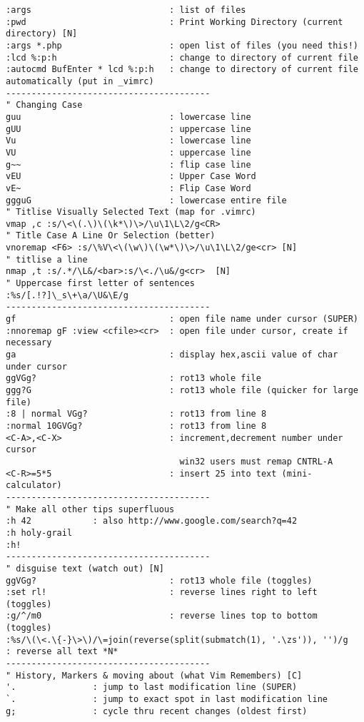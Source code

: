 \documentclass[10pt,landscape]{article}
\begin{document}
\begin{multicols}{2}
\begin{verbatim}
:args                           : list of files
:pwd                            : Print Working Directory (current directory) [N]
:args *.php                     : open list of files (you need this!)
:lcd %:p:h                      : change to directory of current file
:autocmd BufEnter * lcd %:p:h   : change to directory of current file automatically (put in _vimrc)
----------------------------------------
" Changing Case
guu                             : lowercase line
gUU                             : uppercase line
Vu                              : lowercase line
VU                              : uppercase line
g~~                             : flip case line
vEU                             : Upper Case Word
vE~                             : Flip Case Word
ggguG                           : lowercase entire file
" Titlise Visually Selected Text (map for .vimrc)
vmap ,c :s/\<\(.\)\(\k*\)\>/\u\1\L\2/g<CR>
" Title Case A Line Or Selection (better)
vnoremap <F6> :s/\%V\<\(\w\)\(\w*\)\>/\u\1\L\2/ge<cr> [N]
" titlise a line
nmap ,t :s/.*/\L&/<bar>:s/\<./\u&/g<cr>  [N]
" Uppercase first letter of sentences
:%s/[.!?]\_s\+\a/\U&\E/g
----------------------------------------
gf                              : open file name under cursor (SUPER)
:nnoremap gF :view <cfile><cr>  : open file under cursor, create if necessary
ga                              : display hex,ascii value of char under cursor
ggVGg?                          : rot13 whole file
ggg?G                           : rot13 whole file (quicker for large file)
:8 | normal VGg?                : rot13 from line 8
:normal 10GVGg?                 : rot13 from line 8
<C-A>,<C-X>                     : increment,decrement number under cursor
                                  win32 users must remap CNTRL-A
<C-R>=5*5                       : insert 25 into text (mini-calculator)
----------------------------------------
" Make all other tips superfluous
:h 42            : also http://www.google.com/search?q=42
:h holy-grail
:h!
----------------------------------------
" disguise text (watch out) [N]
ggVGg?                          : rot13 whole file (toggles)
:set rl!                        : reverse lines right to left (toggles)
:g/^/m0                         : reverse lines top to bottom (toggles)
:%s/\(\<.\{-}\>\)/\=join(reverse(split(submatch(1), '.\zs')), '')/g   : reverse all text *N*
----------------------------------------
" History, Markers & moving about (what Vim Remembers) [C]
'.               : jump to last modification line (SUPER)
`.               : jump to exact spot in last modification line
g;               : cycle thru recent changes (oldest first)

\end{verbatim}
\end{multicols}
\end{document}
